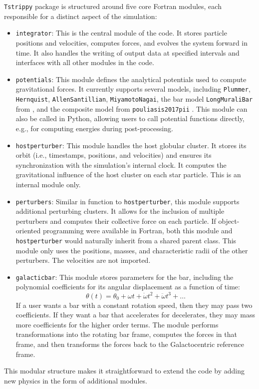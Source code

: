     \texttt{Tstrippy} package is structured around five core Fortran modules, each responsible for a distinct aspect of the simulation:
    \begin{itemize}
        \item \texttt{integrator}: This is the central module of the code. It stores particle positions and velocities, computes forces, and evolves the system forward in time. It also handles the writing of output data at specified intervals and interfaces with all other modules in the code.
        \item \texttt{potentials}: This module defines the analytical potentials used to compute gravitational forces. It currently supports several models, including \texttt{Plummer}, \texttt{Hernquist}, \texttt{AllenSantillian}, \texttt{MiyamotoNagai}, the bar model \texttt{LongMuraliBar} from \citet{1992ApJ...397...44L}, and the composite model from \texttt{pouliasis2017pii} \citep{2017A&A...598A..66P}. This module can also be called in Python, allowing users to call potential functions directly, e.g., for computing energies during post-processing.
        \item \texttt{hostperturber}: This module handles the host globular cluster. It stores its orbit (i.e., timestamps, positions, and velocities) and ensures its synchronization with the simulation's internal clock. It computes the gravitational influence of the host cluster on each star particle. This is an internal module only.
        \item \texttt{perturbers}: Similar in function to \texttt{hostperturber}, this module supports additional perturbing clusters. It allows for the inclusion of multiple perturbers and computes their collective force on each particle. If object-oriented programming were available in Fortran, both this module and \texttt{hostperturber} would naturally inherit from a shared parent class. This module only uses the positions, masses, and characteristic radii of the other perturbers. The velocities are not imported.
        \item \texttt{galacticbar}: This module stores parameters for the bar, including the polynomial coefficients for its angular displacement as a function of time:
        \[
        \theta(t) = \theta_0 + \omega t + \dot{\omega} t^2 + \ddot{\omega} t^3 + \dots
        \]
        If a user wants a bar with a constant rotation speed, then they may pass two coefficients. If they want a bar that accelerates for decelerates, they may mass more coefficients for the higher order terms. The module performs transformations into the rotating bar frame, computes the forces in that frame, and then transforms the forces back to the Galactocentric reference frame.
    \end{itemize}
    This modular structure makes it straightforward to extend the code by adding new physics in the form of additional modules.

